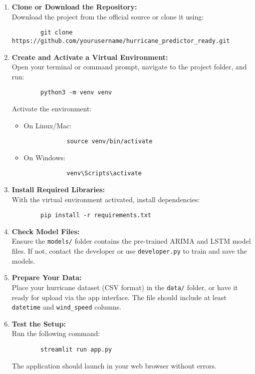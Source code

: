 \begin{enumerate}
	\item \textbf{Clone or Download the Repository:} \\
	Download the project from the official source or clone it using:
	\begin{verbatim}
		git clone https://github.com/yourusername/hurricane_predictor_ready.git
	\end{verbatim}
	
	\item \textbf{Create and Activate a Virtual Environment:} \\
	Open your terminal or command prompt, navigate to the project folder, and run:
	\begin{verbatim}
		python3 -m venv venv
	\end{verbatim}
	Activate the environment:
	\begin{itemize}
		\item On Linux/Mac:
		\begin{verbatim}
			source venv/bin/activate
		\end{verbatim}
		\item On Windows:
		\begin{verbatim}
			venv\Scripts\activate
		\end{verbatim}
	\end{itemize}
	
	\item \textbf{Install Required Libraries:} \\
	With the virtual environment activated, install dependencies:
	\begin{verbatim}
		pip install -r requirements.txt
	\end{verbatim}
	
	\item \textbf{Check Model Files:} \\
	Ensure the \texttt{models/} folder contains the pre-trained ARIMA and LSTM model files. If not, contact the developer or use \texttt{developer.py} to train and save the models.
	
	\item \textbf{Prepare Your Data:} \\
	Place your hurricane dataset (CSV format) in the \texttt{data/} folder, or have it ready for upload via the app interface. The file should include at least \texttt{datetime} and \texttt{wind\_speed} columns.
	
	\item \textbf{Test the Setup:} \\
	Run the following command:
	\begin{verbatim}
		streamlit run app.py
	\end{verbatim}
	The application should launch in your web browser without errors.
\end{enumerate}

